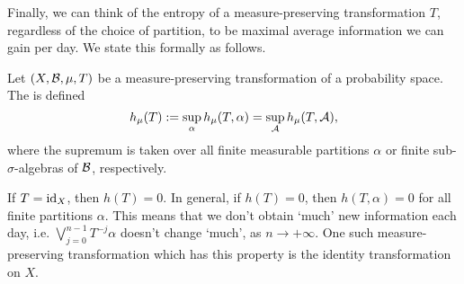 Finally, we can think of the entropy of a measure-preserving transformation $T$, regardless of the choice of partition, to be maximal average information we can gain per day. We state this formally as follows.

\begin{definition}
	Let $(X, \mathcal{B}, \mu, T)$ be a measure-preserving transformation of a probability space. The  is defined
	\[
		h_\mu(T) := \sup_{\alpha}{h_\mu(T, \alpha)} = \sup_{\mathcal{A}}{h_\mu(T, \mathcal{A})},
	\]
	where the supremum is taken over all finite measurable partitions $\alpha$ or finite sub-$\sigma$-algebras of $\mathcal{B}$, respectively.
\end{definition}

\begin{remark}
	If $T = \operatorname{id}_X$, then $h(T) = 0$. In general, if $h(T) = 0$, then $h(T, \alpha) = 0$ for all finite partitions $\alpha$. This means that we don't obtain `much' new information each day, i.e. $\bigvee_{j = 0}^{n - 1}{T^{-j}{\alpha}}$ doesn't change `much', as $n \to +\infty$. One such measure-preserving transformation which has this property is the identity transformation on $X$.
\end{remark}

